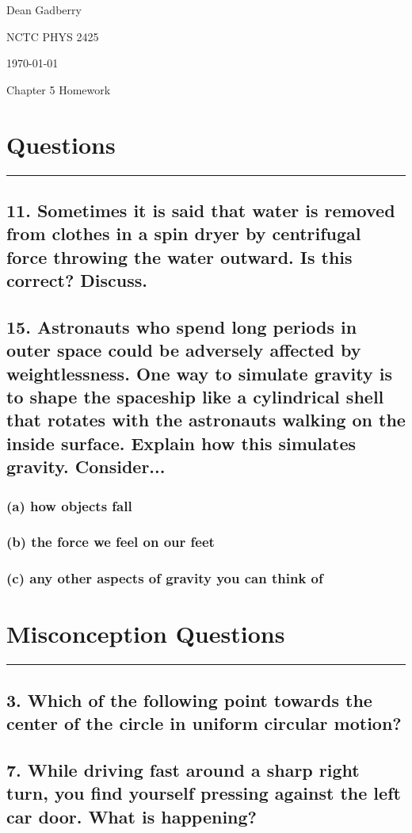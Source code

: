 \documentclass[12pt,a4paper,english]{article}
\begin{document}
\begin{flushright}
  Dean Gadberry

  NCTC PHYS 2425

  \today
\end{flushright}
\begin{center}
  {\large Chapter 5 Homework}
\end{center}
\begin{flushleft}

  \section*{Questions}
  \hrule
  \subsection{11. Sometimes it is said that water is removed from clothes in a spin dryer by centrifugal force throwing the water outward. Is this correct? Discuss.}
  \subsection{15. Astronauts who spend long periods in outer space could be adversely affected by weightlessness. One way to simulate gravity is to shape the spaceship like a cylindrical shell that rotates with the astronauts walking on the inside surface. Explain how this simulates gravity. Consider...}
  \subsubsection{(a) how objects fall}
  \subsubsection{(b) the force we feel on our feet}
  \subsubsection{(c) any other aspects of gravity you can think of}
  \section*{Misconception Questions}
  \hrule
  \subsection{3. Which of the following point towards the center of the circle in uniform circular motion?}
  \subsection{7. While driving fast around a sharp right turn, you find yourself pressing against the left car door. What is happening?}

\end{flushleft}
\end{document}
